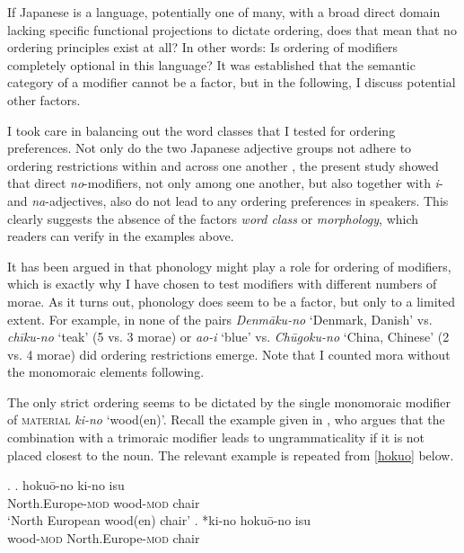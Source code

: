 If Japanese is a language, potentially one of many, with a broad direct domain lacking specific functional projections to dictate ordering, does that mean that no ordering principles exist at all? In other words: Is ordering of modifiers completely optional in this language? It was established that the semantic category of a modifier cannot be a factor, but in the following, I discuss potential other factors.





I took care in balancing out the word classes that I tested for ordering preferences. Not only do the two Japanese adjective groups not adhere to ordering restrictions within and across one another \citep{kohlich:2018:die}, the present study showed that direct \textit{no}-modifiers, not only among one another, but also together with \textit{i}- and \textit{na}-adjectives, also do not lead to any ordering preferences in speakers. This clearly suggests the absence of the factors \textit{word class} or \textit{morphology}, which readers can verify in the examples above. 


\largerpage[-1]
It has been argued in \citet{nagano:2016:are} that phonology might play a role for ordering of modifiers, which is exactly why I have chosen to test modifiers with different numbers of morae. As it turns out, phonology does seem to be a factor, but only to a limited extent. For example, in none of the pairs \textit{Denmāku-no} `Denmark, Danish’ vs. \textit{chīku-no} `teak’ (5 vs. 3 morae) or \textit{ao-i} `blue’ vs. \textit{Chūgoku-no} `China, Chinese’ (2 vs. 4 morae) did ordering restrictions emerge. Note that I counted mora without the monomoraic elements following.

The only strict ordering seems to be dictated by the single monomoraic modifier of \textsc{material} \textit{ki-no} `wood(en)’. Recall the example given in \citet{watanabe:2012:direct}, who argues that the combination with a trimoraic modifier leads to ungrammaticality if it is not placed closest to the noun. The relevant example is repeated from \ref{hokuo} below.

\ex. \ag. hokuō-no ki-no isu \\
North.Europe-\textsc{mod} wood-\textsc{mod} chair\\
`North European wood(en) chair'
\bg. *ki-no hokuō-no isu\\
wood-\textsc{mod} North.Europe-\textsc{mod} chair \\ \null \hfill \citep[508]{watanabe:2012:direct}

